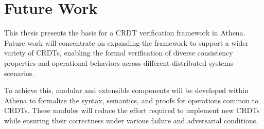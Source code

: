 


\chapter{Future Work}
\label{cha:future}

This thesis presents the basis for a CRDT verification framework in Athena. Future work will concentrate on expanding the framework to support a wider variety of CRDTs, enabling the formal verification of diverse consistency properties and operational behaviors across different distributed systems scenarios.

To achieve this, modular and extensible components will be developed within Athena to formalize the syntax, semantics, and proofs for operations common to CRDTs. These modules will reduce the effort required to implement new CRDTs while ensuring their correctness under various failure and adversarial conditions.
\endinput

